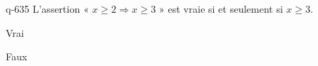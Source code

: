 \begin{truefalse}{q-635}
L'assertion « $x\geq 2 \Rightarrow x \geq 3$ » est vraie si et seulement si $x\geq 3$.
\item Vrai
\item* Faux
\end{truefalse}

